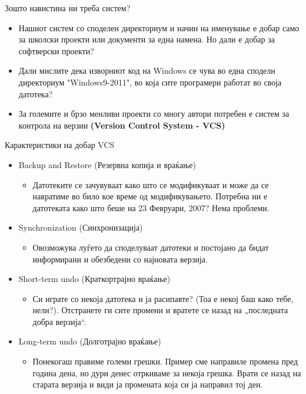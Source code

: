 \begin{frame}{Зошто навистина ни треба систем?}
\begin{itemize}
    \item Нашиот систем со споделен директориум и начин на именување е добар
    само за школски проекти или документи за една намена. Но дали е добар за софтверски
  проекти?
    \item Дали мислите дека изворниот код на Windows се чува во една споделн
    директориум "Windows9-2011", во која сите програмери работат во своја
    датотека?
    \item За големите и брзо менливи проекти со многу автори потребен е систем
    за контрола на верзии \textbf{(Version Control System - VCS)}
\end{itemize}
\end{frame}

\begin{frame}{Карактеристики на добар VCS}
\begin{itemize}
    \item Backup and Restore (Резервна копија и враќање)
    \begin{itemize} 
        \item Датотеките се зачувуваат како што се модификуваат и може да се
        навратиме во било кое време од модификувањето. Потребна ни е датотеката
        како што беше на 23 Февруари, 2007? Нема проблеми.
    \end{itemize}
    \item Synchronization (Синхронизација)
    \begin{itemize} 
        \item Овозможува луѓето да споделуваат датотеки и постојано да бидат
        информирани и обезбедени со најновата верзија.
    \end{itemize}
    \item Short-term undo (Краткортрајно враќање)
    \begin{itemize} 
        \item Си играте со некоја датотека и ја расипавте? (Тоа е некој
        баш како тебе, нели?). Отстранете ги сите промени и вратете се
        назад на „последната добра верзија“.
    \end{itemize}
    \item Long-term undo (Долготрајно враќање)
    \begin{itemize} 
        \item Понекогаш правиме големи грешки. Пример сме направиле
        промена пред година дена, но дури денес отркиваме за некоја
        грешка. Врати се назад на старата верзија и види ја промената
        која си ја направил тој ден.
    \end{itemize}
\end{itemize}
\end{frame}


